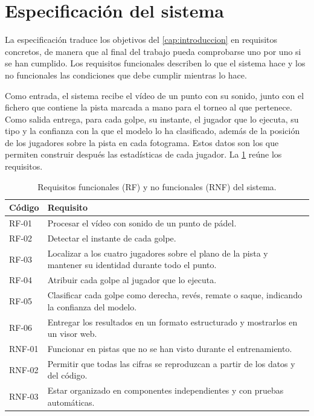 
\section{Especificación del sistema}
\label{sec:especificacion}

La especificación traduce los objetivos del \cref{cap:introduccion} en requisitos concretos, de manera que al final del trabajo pueda comprobarse uno por uno si se han cumplido.
Los requisitos funcionales describen lo que el sistema hace y los no funcionales las condiciones que debe cumplir mientras lo hace.

Como entrada, el sistema recibe el vídeo de un punto con su sonido, junto con el fichero que contiene la pista marcada a mano para el torneo al que pertenece.
Como salida entrega, para cada golpe, su instante, el jugador que lo ejecuta, su tipo y la confianza con la que el modelo lo ha clasificado, además de la posición de los jugadores sobre la pista en cada fotograma.
Estos datos son los que permiten construir después las estadísticas de cada jugador.
La \cref{tab:requisitos} reúne los requisitos.

\begin{table}[htbp]
  \centering
  \caption{Requisitos funcionales (RF) y no funcionales (RNF) del sistema.}
  \label{tab:requisitos}
  \small
  \begin{tabular}{p{1.8cm}p{12.8cm}}
    \toprule
    Código & Requisito \\
    \midrule
    RF-01 & Procesar el vídeo con sonido de un punto de pádel. \\
    RF-02 & Detectar el instante de cada golpe. \\
    RF-03 & Localizar a los cuatro jugadores sobre el plano de la pista y mantener su identidad durante todo el punto. \\
    RF-04 & Atribuir cada golpe al jugador que lo ejecuta. \\
    RF-05 & Clasificar cada golpe como derecha, revés, remate o saque, indicando la confianza del modelo. \\
    RF-06 & Entregar los resultados en un formato estructurado y mostrarlos en un visor web. \\
    RNF-01 & Funcionar en pistas que no se han visto durante el entrenamiento. \\
    RNF-02 & Permitir que todas las cifras se reproduzcan a partir de los datos y del código. \\
    RNF-03 & Estar organizado en componentes independientes y con pruebas automáticas. \\
    \bottomrule
  \end{tabular}
\end{table}

